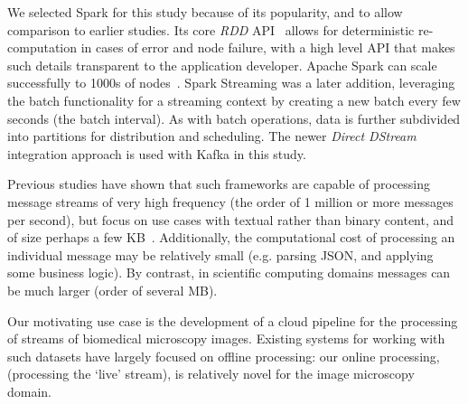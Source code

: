 \documentclass[conference]{IEEEtran}
\begin{document}
We selected Spark for this study because of its popularity, and to allow comparison to earlier studies. Its core \emph{RDD} API~\cite{Zaharia:2012:RDD:2228298.2228301} allows for deterministic re-computation in cases of error and node failure, with a high level API that makes such details transparent to the application developer. Apache Spark can scale successfully to 1000s of nodes~\cite{xinApacheSparkFastest2014}. Spark Streaming was a later addition, leveraging the batch functionality for a streaming context by creating a new batch every few seconds (the batch interval). As with batch operations, data is further subdivided into partitions for distribution and scheduling. The newer \emph{Direct DStream} integration approach is used with Kafka in this study. 






Previous studies have shown that such frameworks are capable of processing message streams of very high frequency (the order of 1 million or more messages per second), but focus on use cases with textual rather than binary content, and of size perhaps a few KB~\cite{chintapalliBenchmarkingStreamingComputation2016,grierExtendingYahooStreaming2016,qianBenchmarkingModernDistributed2016}. Additionally, the computational cost of processing an individual message may be relatively small (e.g. parsing JSON, and applying some business logic). By contrast, in scientific computing domains messages can be much larger (order of several MB).



Our motivating use case 
is the development of a cloud pipeline for the processing of streams of biomedical microscopy images. Existing systems for working with such datasets have largely focused on offline processing: our online processing, (processing the `live' stream),
is relatively novel for the image microscopy domain.%
\end{document}
